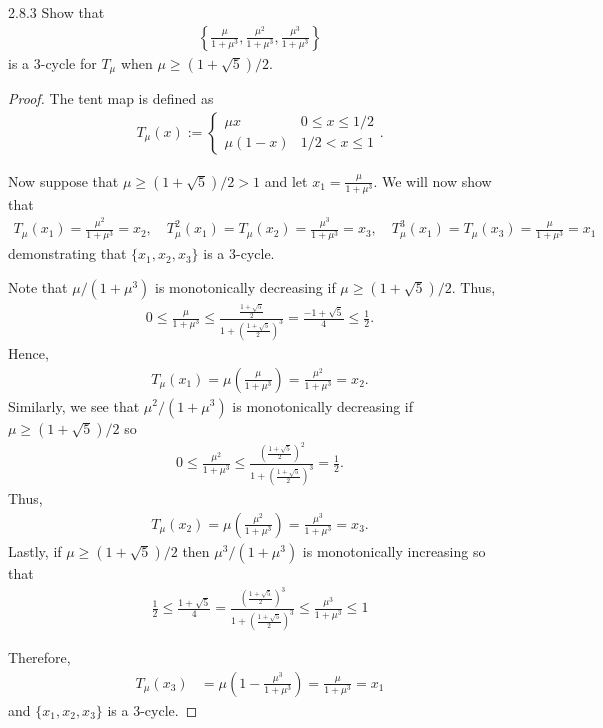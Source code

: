 \begin{problem}{2.8.3}
  Show that
  \begin{align*}
    \left\{\frac{\mu}{1+\mu^3}, \frac{\mu^2}{1+\mu^3}, \frac{\mu^3}{1+\mu^3}\right\}
  \end{align*}
  is a 3-cycle for $T_\mu$ when $\mu \geq (1+\sqrt{5})/2$.
\end{problem}

\begin{proof}
  The tent map is defined as
  \begin{align*}
    T_\mu(x) :=
    \begin{cases}
      \mu x & 0 \leq x \leq 1/2 \\
      \mu (1- x) & 1/2 < x \leq 1
    \end{cases}.
  \end{align*}

  Now suppose that $\mu \geq (1+\sqrt{5})/2 > 1$ and let $x_1 = \frac{\mu}{1+\mu^3}$.
  We will now show that
  \begin{align*}
    T_\mu(x_1) = \frac{\mu^2}{1+\mu^3} = x_2, \quad T_\mu^2(x_1) = T_\mu(x_2) = \frac{\mu^3}{1+\mu^3} = x_3, \quad T_\mu^3(x_1) = T_\mu(x_3) = \frac{\mu}{1+\mu^3} = x_1
  \end{align*}
  demonstrating that $\{x_1, x_2, x_3\}$ is a 3-cycle.

  Note that $\mu / (1+\mu^3)$ is monotonically decreasing if $\mu \geq (1 + \sqrt{5})/2$. Thus,
  \begin{align*}
    0 \leq \frac{\mu}{1+\mu^3} \leq \frac{\frac{1 + \sqrt{5}}{2}}{1 + \left(\frac{1 + \sqrt{5}}{2}\right)^3} = \frac{-1 + \sqrt{5}}{4} \leq \frac{1}{2}.
  \end{align*}
  Hence,
  \begin{align*}
    T_\mu(x_1) = \mu\left(\frac{\mu}{1 + \mu^3}\right) = \frac{\mu^2}{1 + \mu^3} = x_2.
  \end{align*}
  Similarly, we see that $\mu^2 / (1+\mu^3)$ is monotonically decreasing if $\mu\geq (1 + \sqrt{5})/2$ so
  \begin{align*}
    0 \leq \frac{\mu^2}{1+\mu^3} \leq \frac{\left(\frac{1 + \sqrt{5}}{2}\right)^2}{1 + \left(\frac{1 + \sqrt{5}}{2}\right)^3} = \frac{1}{2}.
  \end{align*}
  Thus,
  \begin{align*}
    T_\mu(x_2) = \mu\left(\frac{\mu^2}{1 + \mu^3}\right) = \frac{\mu^3}{1 + \mu^3} = x_3.
  \end{align*}
  Lastly, if $\mu \geq (1 + \sqrt{5})/2$ then $\mu^3 / (1+\mu^3)$ is monotonically
  increasing so that
  \begin{align*}
    \frac{1}{2} \leq \frac{1 + \sqrt{5}}{4} = \frac{\left(\frac{1 + \sqrt{5}}{2}\right)^3}{1 + \left(\frac{1 + \sqrt{5}}{2}\right)^3} \leq \frac{\mu^3}{1+\mu^3} \leq 1
  \end{align*}

  Therefore,
  \begin{align*}
    T_\mu(x_3)
    &= \mu\left(1-\frac{\mu^3}{1 + \mu^3}\right) = \frac{\mu }{1 + \mu^3} = x_1
  \end{align*}
  and $\{x_1, x_2, x_3\}$ is a 3-cycle.

\end{proof}
\newpage
